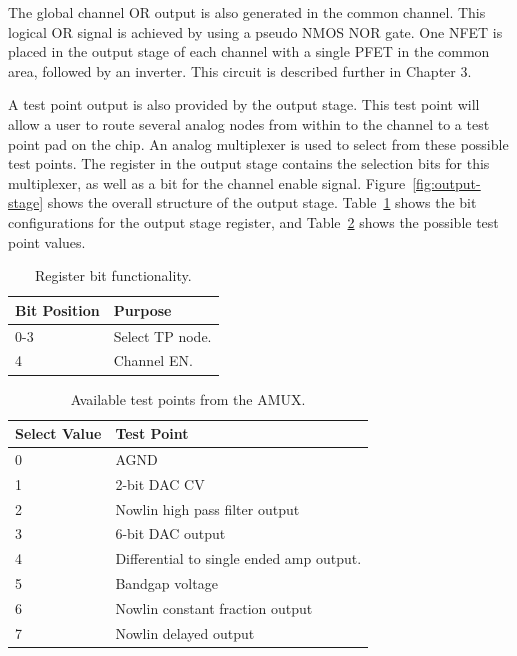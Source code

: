 \documentclass[12pt,oneside,final]{siuethesis}
\theoremstyle{definition}
\begin{document}
\par The global channel OR output is also generated in the common channel. This logical OR signal is achieved by using a pseudo NMOS NOR gate. One NFET is placed in the output stage of each channel with a single PFET in the common area, followed by an inverter. This circuit is described further in Chapter 3.
\par A test point output is also provided by the output stage. This test point will allow a user to route several analog nodes from within to the channel to a test point pad on the chip. An analog multiplexer is used to select from these possible test points. The register in the output stage contains the selection bits for this multiplexer, as well as a bit for the channel enable signal. Figure~\ref{fig:output-stage} shows the overall structure of the output stage. Table~\ref{tab:outreg} shows the bit configurations for the output stage register, and Table~\ref{tab:tpval} shows the possible test point values.

\begin{table}[ht]
\centering
	\begin{tabular}{|l|p{3cm}|}
		\hline
		Bit Position & Purpose\\\hline
		0-3 & Select TP node.\\\hline
		4 & Channel EN.\\\hline
	\end{tabular}
    \caption{Register bit functionality.}
 	\label{tab:outreg}
 	\end{table}
 	\begin{table}[ht]
 	\centering
	\begin{tabular}{|l|p{7cm}|}
		\hline
		Select Value & Test Point\\\hline
		0 & AGND\\\hline
		1 & 2-bit DAC CV\\\hline
		2 & Nowlin high pass filter output\\\hline
		3 & 6-bit DAC output\\\hline
		4 & Differential to single ended amp output.\\\hline
		5 & Bandgap voltage\\\hline
		6 & Nowlin constant fraction output\\\hline
		7 & Nowlin delayed output\\\hline
	\end{tabular}
    \caption{Available test points from the AMUX.}
 	\label{tab:tpval}
\end{table}
\end{document}
